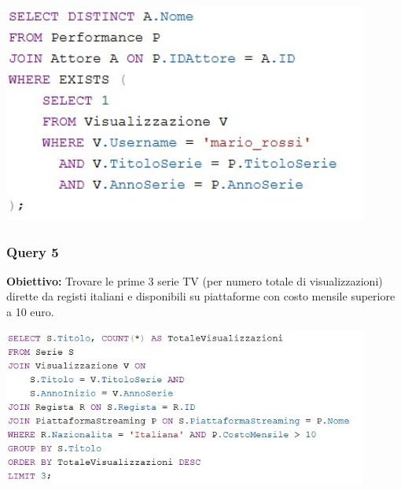 \documentclass[12pt,a4paper]{article}
\begin{document}
\vspace{0.5cm}
\begin{center}
\includegraphics[width=0.9\textwidth]{Query4.jpg}
\end{center}

\vspace{1cm}

\subsubsection*{Query 5}
\textbf{Obiettivo:} Trovare le prime 3 serie TV (per numero totale di visualizzazioni) dirette da registi italiani e disponibili su piattaforme con costo mensile superiore a 10 euro.

\vspace{0.5cm}
\begin{center}
\includegraphics[width=0.9\textwidth]{Query5.jpg}
\end{center}

\vspace{1cm}
\end{document}
